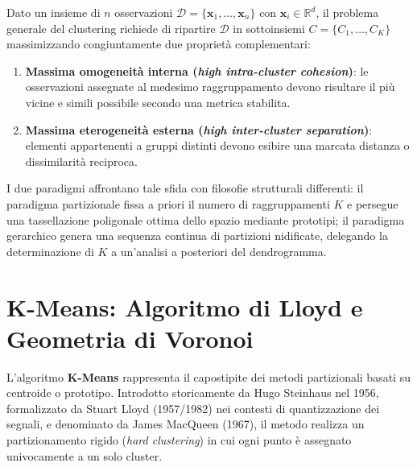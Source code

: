 Dato un insieme di $n$ osservazioni $\mathcal{D} = \{\mathbf{x}_1, \dots, \mathbf{x}_n\}$ con $\mathbf{x}_i \in \mathbb{R}^d$, il problema generale del clustering richiede di ripartire $\mathcal{D}$ in sottoinsiemi $C = \{C_1, \dots, C_K\}$ massimizzando congiuntamente due proprietà complementari:
\begin{enumerate}
    \item \textbf{Massima omogeneità interna (\textit{high intra-cluster cohesion})}: le osservazioni assegnate al medesimo raggruppamento devono risultare il più vicine e simili possibile secondo una metrica stabilita.
    \item \textbf{Massima eterogeneità esterna (\textit{high inter-cluster separation})}: elementi appartenenti a gruppi distinti devono esibire una marcata distanza o dissimilarità reciproca.
\end{enumerate}

I due paradigmi affrontano tale sfida con filosofie strutturali differenti: il paradigma partizionale fissa a priori il numero di raggruppamenti $K$ e persegue una tassellazione poligonale ottima dello spazio mediante prototipi; il paradigma gerarchico genera una sequenza continua di partizioni nidificate, delegando la determinazione di $K$ a un'analisi a posteriori del dendrogramma.

\section{K-Means: Algoritmo di Lloyd e Geometria di Voronoi}
\label{sec:dm-kmeans-algorithm-geometry}

L'algoritmo \textbf{K-Means} rappresenta il capostipite dei metodi partizionali basati su centroide o prototipo. Introdotto storicamente da Hugo Steinhaus nel 1956, formalizzato da Stuart Lloyd (1957/1982) nei contesti di quantizzazione dei segnali, e denominato da James MacQueen (1967), il metodo realizza un partizionamento rigido (\textit{hard clustering}) in cui ogni punto è assegnato univocamente a un solo cluster.


